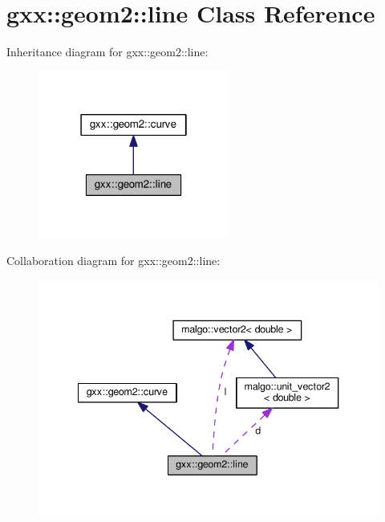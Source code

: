 \hypertarget{classgxx_1_1geom2_1_1line}{}\section{gxx\+:\+:geom2\+:\+:line Class Reference}
\label{classgxx_1_1geom2_1_1line}


Inheritance diagram for gxx\+:\+:geom2\+:\+:line\+:
\nopagebreak
\begin{figure}[H]
\begin{center}
\leavevmode
\includegraphics[width=178pt]{classgxx_1_1geom2_1_1line__inherit__graph}
\end{center}
\end{figure}


Collaboration diagram for gxx\+:\+:geom2\+:\+:line\+:
\nopagebreak
\begin{figure}[H]
\begin{center}
\leavevmode
\includegraphics[width=340pt]{classgxx_1_1geom2_1_1line__coll__graph}
\end{center}
\end{figure}
